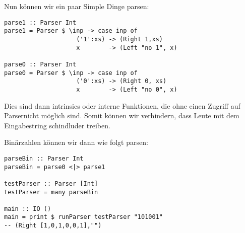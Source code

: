 \documentclass{beamer}
\begin{document}
\begin{frame}[fragile]
Nun können wir ein paar Simple Dinge parsen:
\begin{verbatim}
parse1 :: Parser Int
parse1 = Parser $ \inp -> case inp of
                    ('1':xs) -> (Right 1,xs)
                    x        -> (Left "no 1", x)

parse0 :: Parser Int
parse0 = Parser $ \inp -> case inp of
                    ('0':xs) -> (Right 0, xs)
                    x        -> (Left "no 0", x)
\end{verbatim}
\pause
Dies sind dann intrinsics oder interne Funktionen, die ohne einen Zugriff auf \glqq Parser\grqq nicht möglich sind. Somit können wir verhindern, dass Leute mit dem Eingabestring schindluder treiben.
\end{frame}

\begin{frame}[fragile]
Binärzahlen können wir dann wie folgt parsen:
\begin{verbatim}
parseBin :: Parser Int
parseBin = parse0 <|> parse1

testParser :: Parser [Int]
testParser = many parseBin

main :: IO ()
main = print $ runParser testParser "101001"
-- (Right [1,0,1,0,0,1],"")
\end{verbatim}
\end{frame}
\end{document}
